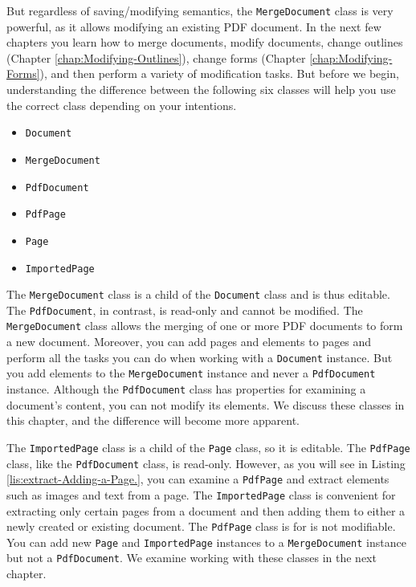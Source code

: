 \documentclass[american,letterpaper]{tufte-book}
\numberwithin{equation}{section}
\numberwithin{figure}{section}
\begin{document}
{{But regardless of saving/modifying semantics, the \texttt{MergeDocument}
class is very powerful, as it allows modifying an existing PDF document.
In the next few chapters you learn how to merge documents, modify
documents, change outlines (Chapter \ref{chap:Modifying-Outlines}),
change forms (Chapter \ref{chap:Modifying-Forms}), and then perform
a variety of modification tasks. But before we begin, understanding
the difference between the following six classes will help you use
the correct class depending on your intentions.
\begin{itemize}
\item \texttt{Document}
\item \texttt{MergeDocument}
\item \texttt{PdfDocument}
\item \texttt{PdfPage }
\item \texttt{Page}
\item \texttt{ImportedPage}
\end{itemize}
The \texttt{MergeDocument} class is a child of the \texttt{Document}
class and is thus editable. The \texttt{PdfDocument}, in contrast,
is read-only and cannot be modified. The \texttt{MergeDocument} class
allows the merging of one or more PDF documents to form a new document.
Moreover, you can add pages and elements to pages and perform all
the tasks you can do when working with a \texttt{Document} instance.
But you add elements to the \texttt{MergeDocument} instance and never
a \texttt{PdfDocument} instance. Although the \texttt{PdfDocument}
class has properties for examining a document's content, you can not
modify its elements. We discuss these classes in this chapter, and
the difference will become more apparent.

The \texttt{ImportedPage} class is a child of the \texttt{Page} class,
so it is editable. The \texttt{PdfPage} class, like the \texttt{PdfDocument}
class, is read-only. However, as you will see in Listing \ref{lis:extract-Adding-a-Page.},
you can examine a \texttt{PdfPage} and extract elements such as images
and text from a page. The \texttt{ImportedPage} class is convenient
for extracting only certain pages from a document and then adding
them to either a newly created or existing document. The \texttt{PdfPage}
class is for is not modifiable. You can add new \texttt{Page} and
\texttt{ImportedPage} instances to a \texttt{MergeDocument} instance
but not a \texttt{PdfDocument}. We examine working with these classes
in the next chapter.

}}
\end{document}
